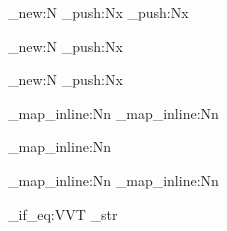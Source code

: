 
\seq_new:N   \sections@clb@entryFiles 
\seq_push:Nx 
\seq_push:Nx 

\seq_new:N   \sections@clb@entryRoots
\seq_push:Nx 

\seq_new:N   \sections@clb@entryParts
\seq_push:Nx 

\seq_map_inline:Nn \sections@clb@entryRoots
{
    \seq_map_inline:Nn \sections@clb@entryFiles
    {
    }
}

\seq_map_inline:Nn \sections@clb@entryRoots
{
}

\seq_map_inline:Nn \sections@clb@entryRoots
{
    \seq_map_inline:Nn \sections@clb@entryParts
    {
    }
}


\NewDocumentCommand{\sections@onLoad}{}
{
    \sections@frame@bgn

    \str_if_eq:VVT \frmNameSection \sections@const@maintext_str
    {
        \sections@register
    }
}

\NewDocumentCommand{\sections@onDrop}{}
{
    \sections@frame@end
}

\NewDocumentCommand{\sections@onSection}{}
{
    
    \dontIncludeSelf
}

\NewDocumentCommand{\sections@part@onLoad}{}
{
    \sections@part@bgn
}

\NewDocumentCommand{\sections@part@onDrop}{}
{
    \sections@part@end
}

